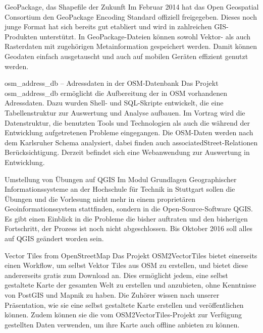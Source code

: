 \renewcommand{\konferenztag}{\dienstag}
%
{GeoPackage, das Shapefile der Zukunft}%
{}%
{Im Februar 2014 hat das Open Geospatial Consortium den GeoPackage Encoding Standard offiziell
freigegeben. Dieses noch junge Format hat sich bereits gut etabliert und wird in zahlreichen GIS-Produkten unterstützt.
In Geo\-Package-Dateien können sowohl Vektor- als auch Rasterdaten mit zugehörigen Metainformation gespei\-chert
werden. Damit können Geodaten einfach ausgetauscht und auch auf mobilen Geräten effizient genutzt werden.}

%
{osm\_address\_db -- Adressdaten in der OSM-Datenbank}%
{}%
{Das Projekt osm\_address\_db ermöglicht die Aufbereitung der in OSM vorhandenen Adressdaten. Dazu wurden Shell-
und SQL-Skripte entwickelt, die eine Tabellenstruktur zur Auswertung und Analyse aufbauen.
Im Vortrag wird die Datenstruktur, die benutzten Tools und Technologien als auch die während der
Entwicklung aufgetretenen Probleme eingegangen. Die OSM-Daten werden nach dem Karlsruher Schema analysiert,
dabei finden auch associated\-Street-Relationen Berücksichtigung.
Derzeit befindet sich eine Webanwendung zur Auswertung in Entwicklung.}

%
{Umstellung von Übungen auf QGIS}%
{}%
{Im Modul Grundlagen Geographischer Informationssysteme an der Hochschule für Technik in Stuttgart
sollen die Übungen und die Vorlesung nicht mehr in einem proprietären Geoinformationssystem
stattfinden, sondern in die Open-Source-Software QGIS. Es gibt einen Einblick in die Probleme
die bisher auftraten und den bisherigen Fortschritt, der Prozess ist noch nicht abgeschlossen.
Bis Oktober 2016 soll alles auf QGIS geändert worden sein.}

%
{Vector Tiles from OpenStreetMap}%
{}%
{Das Projekt OSM2VectorTiles bietet einerseits einen Workflow, um selbst Vektor Tiles aus OSM zu erstellen,
und bietet diese andererseits gratis zum Download an. Dies ermöglicht jedem, eine selbst gestaltete Karte der
gesamten Welt zu erstellen und anzubieten, ohne Kenntnisse von PostGIS und Mapnik zu haben.
Die Zuhörer wissen nach unserer Präsentation, wie sie eine selbst gestaltete Karte erstellen
und veröffentlichen können. Zudem können sie die vom OSM2VectorTiles-Projekt zur Verfügung gestellten
Daten verwenden, um ihre Karte auch offline anbieten zu können.}


